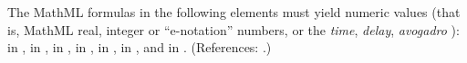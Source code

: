 The MathML formulas in the following elements must yield numeric
values (that is, MathML real, integer or ``e-notation'' numbers,
or the \emph{time}, \emph{delay}, \emph{avogadro} ):
 in \KineticLaw,  in
\InitialAssignment,  in \AssignmentRule,  in
\RateRule,  in \AlgebraicRule,  in \Event
\Delay, and  in \EventAssignment.  (References: .)


